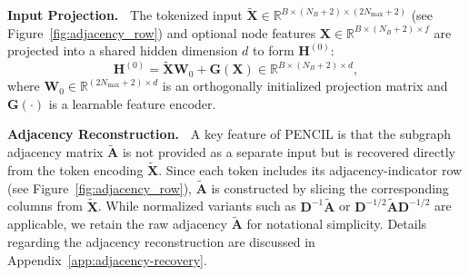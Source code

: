 \documentclass{article}
\theoremstyle{plain}
\theoremstyle{definition}
\theoremstyle{remark}
\begin{document}
\textbf{Input Projection.~}
The tokenized input \(\tilde{\mathbf{X}}\in\mathbb{R}^{B\times (N_B+2)\times (2N_{\max}+2)}\) (see Figure~\ref{fig:adjacency_row}) and optional node features $\mathbf{X} \in \mathbb{R}^{B\times (N_B+2) \times f}$ are projected into a shared hidden dimension $d$ to form $\mathbf{H}^{(0)}$:
\begin{equation}
\mathbf{H}^{(0)}=\tilde{\mathbf{X}}\mathbf{W}_0 + \mathbf{G}\!\left(\mathbf{X}\right) \in \mathbb{R}^{B\times (N_B+2)\times d},
\label{eq:input-proj}
\end{equation}
where $\mathbf{W}_0 \in \mathbb{R}^{(2N_{\max}+2) \times d}$ is an orthogonally initialized projection matrix and $\mathbf{G}(\cdot)$ is a learnable feature encoder.

\textbf{Adjacency Reconstruction.~}
A key feature of PENCIL is that the subgraph adjacency matrix \(\tilde{\mathbf{A}}\) is not provided as a separate input but is recovered directly from the token encoding \(\tilde{\mathbf{X}}\). Since each token includes its adjacency-indicator row (see Figure~\ref{fig:adjacency_row}), \(\tilde{\mathbf{A}}\) is constructed by slicing the corresponding columns from \(\tilde{\mathbf{X}}\). 
While normalized variants such as $\mathbf{D}^{-1}\tilde{\mathbf{A}}$ or $\mathbf{D}^{-1/2}\tilde{\mathbf{A}}\mathbf{D}^{-1/2}$ are applicable, we retain the raw adjacency $\tilde{\mathbf{A}}$ for notational simplicity. Details regarding the adjacency reconstruction are discussed in Appendix~\ref{app:adjacency-recovery}.
\end{document}
